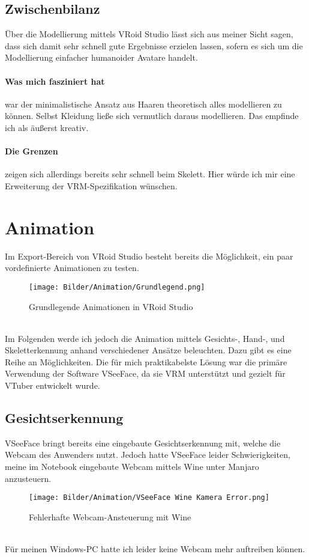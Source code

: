 \documentclass[a4paper, 12pt]{article}
\begin{document}
\subsection{Zwischenbilanz}
\label{subsec:model-result}
Über die Modellierung mittels VRoid Studio\cite{vroid-studio} lässt sich aus meiner Sicht sagen,
dass sich damit sehr schnell gute Ergebnisse erzielen lassen,
sofern es sich um die Modellierung einfacher humanoider Avatare handelt.
\paragraph{Was mich fasziniert hat} war der minimalistische Ansatz aus Haaren theoretisch alles modellieren zu können.
Selbst Kleidung ließe sich vermutlich daraus modellieren.
Das empfinde ich als äußerst kreativ.
\paragraph{Die Grenzen} zeigen sich allerdings bereits sehr schnell beim Skelett.
Hier würde ich mir eine Erweiterung der VRM\cite{vrm-page}-Spezifikation wünschen.
\newpage

\section{Animation}
\label{sec:animation}
Im Export-Bereich von VRoid Studio\cite{vroid-studio} besteht bereits die Möglichkeit,
ein paar vordefinierte Animationen zu testen.
\begin{figure}[htbp]
    \centering
    \texttt{[image: Bilder/Animation/Grundlegend.png]}
    \caption{Grundlegende Animationen in VRoid Studio\cite{vroid-studio}}
\end{figure}
\\Im Folgenden werde ich jedoch die Animation mittels
Gesichts-, Hand-, und Skeletterkennung anhand verschiedener Ansätze beleuchten.
Dazu gibt es eine Reihe an Möglichkeiten.
Die für mich praktikabelste Lösung war die primäre Verwendung der Software VSeeFace\cite{vseeface},
da sie VRM unterstützt und gezielt für VTuber entwickelt wurde.
\newpage

\subsection{Gesichtserkennung}
\label{subsec:facetracking}
VSeeFace\cite{vseeface} bringt bereits eine eingebaute Gesichtserkennung mit,
welche die Webcam des Anwenders nutzt.
Jedoch hatte VSeeFace\cite{vseeface} leider Schwierigkeiten,
meine im Notebook eingebaute Webcam mittels Wine\cite{wine}
unter Manjaro\cite{manjaro} anzusteuern.
\begin{figure}[htbp]
    \centering
    \texttt{[image: Bilder/Animation/VSeeFace Wine Kamera Error.png]}
    \caption{Fehlerhafte Webcam-Ansteuerung mit Wine}
\end{figure}
\\Für meinen Windows\cite{win10}-PC hatte ich leider keine Webcam mehr auftreiben können.
\end{document}
